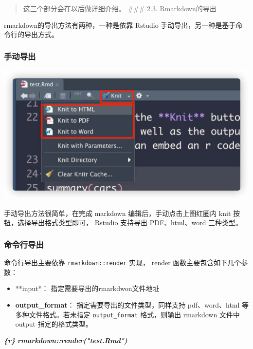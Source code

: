 \documentclass[
]{book}
\newenvironment{Shaded}{\begin{snugshade}}{\end{snugshade}}
\newcommand{\InformationTok}[1]{\textcolor[rgb]{0.56,0.35,0.01}{\textbf{\textit{#1}}}}
\providecommand{\tightlist}{%
  \setlength{\itemsep}{0pt}\setlength{\parskip}{0pt}}
\begin{document}
\begin{quote}
这三个部分会在以后做详细介绍。 \#\#\# 2.3. Rmarkdown的导出
\end{quote}

rmarkdown的导出方法有两种，一种是依靠 Rstudio
手动导出，另一种是基于命令行的导出方式。

\hypertarget{ux624bux52a8ux5bfcux51fa}{%
\subsubsection{手动导出}\label{ux624bux52a8ux5bfcux51fa}}

\includegraphics{images/paste-3AB25E87.png}

手动导出方法很简单，在完成 markdown 编辑后，手动点击上图红圈内 knit
按钮，选择导出格式类型即可， Rstudio 支持导出 PDF、html、word 三种类型。

\hypertarget{ux547dux4ee4ux884cux5bfcux51fa}{%
\subsubsection{命令行导出}\label{ux547dux4ee4ux884cux5bfcux51fa}}

命令行导出主要依靠 \texttt{rmarkdown::render} 实现， render
函数主要包含如下几个参数：

\begin{itemize}
\tightlist
\item
  **input*： 指定需要导出的rmarkdwon文件地址
\item
  \textbf{output\_format}： 指定需要导出的文件类型，同样支持 pdf、word、html
  等多种文件格式。若未指定 \texttt{output\_format} 格式，则输出 rmarkdown
  文件中 output 指定的格式类型。
\end{itemize}

\begin{Shaded}
\begin{Highlighting}[]
\InformationTok{\textasciigrave{}\textasciigrave{}\textasciigrave{}\{r\} }
\InformationTok{rmarkdown::render("test.Rmd")}
\InformationTok{\textasciigrave{}\textasciigrave{}\textasciigrave{}}
\end{Highlighting}
\end{Shaded}
\end{document}

